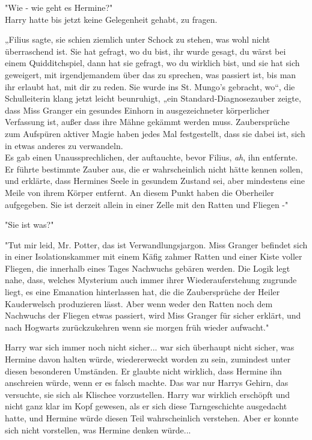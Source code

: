 {"Wie - wie geht es Hermine?"\\ Harry hatte bis jetzt keine Gelegenheit gehabt, zu fragen.

„Filius sagte, sie schien ziemlich unter Schock zu stehen, was wohl nicht überraschend ist. Sie hat gefragt, wo du bist, ihr wurde gesagt, du wärst bei einem Quidditchspiel, dann hat sie gefragt, wo du wirklich bist, und sie hat sich geweigert, mit irgendjemandem über das zu sprechen, was passiert ist, bis man ihr erlaubt hat, mit dir zu reden. Sie wurde ins St. Mungo's gebracht, wo“, die Schulleiterin klang jetzt leicht beunruhigt, „ein Standard-Diagnosezauber zeigte, dass Miss Granger ein gesundes Einhorn in ausgezeichneter körperlicher Verfassung ist, außer dass ihre Mähne gekämmt werden muss. Zaubersprüche zum Aufspüren aktiver Magie haben jedes Mal festgestellt, dass sie dabei ist, sich in etwas anderes zu verwandeln.\\ Es gab einen Unaussprechlichen, der auftauchte, bevor Filius, \emph{ah}, ihn entfernte. Er führte bestimmte Zauber aus, die er wahrscheinlich nicht hätte kennen sollen, und erklärte, dass Hermines Seele in gesundem Zustand sei, aber mindestens eine Meile von ihrem Körper entfernt. An diesem Punkt haben die Oberheiler aufgegeben. Sie ist derzeit allein in einer Zelle mit den Ratten und Fliegen -"

"Sie ist was?"

"Tut mir leid, Mr. Potter, das ist Verwandlungsjargon. Miss Granger befindet sich in einer Isolationskammer mit einem Käfig zahmer Ratten und einer Kiste voller Fliegen, die innerhalb eines Tages Nachwuchs gebären werden. Die Logik legt nahe, dass, welches Mysterium auch immer ihrer Wiederauferstehung zugrunde liegt, es eine Emanation hinterlassen hat, die die Zaubersprüche der Heiler Kauderwelsch produzieren lässt. Aber wenn weder den Ratten noch dem Nachwuchs der Fliegen etwas passiert, wird Miss Granger für sicher erklärt, und nach Hogwarts zurückzukehren wenn sie morgen früh wieder aufwacht."

Harry war sich immer noch nicht sicher... war sich überhaupt nicht sicher, was Hermine davon halten würde, wiedererweckt worden zu sein, zumindest unter diesen besonderen Umständen. Er glaubte nicht wirklich, dass Hermine ihn anschreien würde, wenn er es falsch machte. Das war nur Harrys Gehirn, das versuchte, sie sich als Klischee vorzustellen. Harry war wirklich erschöpft und nicht ganz klar im Kopf gewesen, als er sich diese Tarngeschichte ausgedacht hatte, und Hermine würde diesen Teil wahrscheinlich verstehen. Aber er konnte sich nicht vorstellen, was Hermine denken würde...

}
